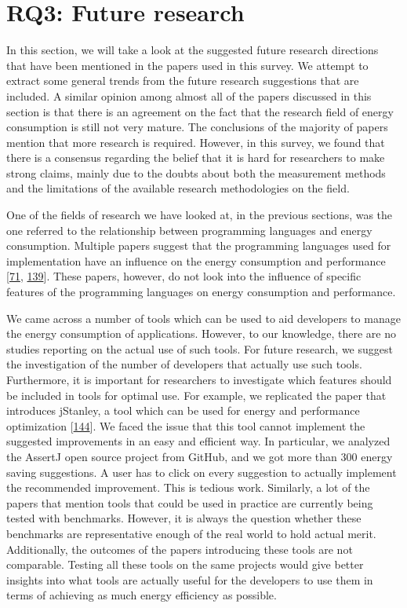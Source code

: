 \documentclass[]{book}
\begin{document}
\section{RQ3: Future research}\label{rq3-future-research-1}

In this section, we will take a look at the suggested future research
directions that have been mentioned in the papers used in this survey.
We attempt to extract some general trends from the future research
suggestions that are included. A similar opinion among almost all of the
papers discussed in this section is that there is an agreement on the
fact that the research field of energy consumption is still not very
mature. The conclusions of the majority of papers mention that more
research is required. However, in this survey, we found that there is a
consensus regarding the belief that it is hard for researchers to make
strong claims, mainly due to the doubts about both the measurement
methods and the limitations of the available research methodologies on
the field.

One of the fields of research we have looked at, in the previous
sections, was the one referred to the relationship between programming
languages and energy consumption. Multiple papers suggest that the
programming languages used for implementation have an influence on the
energy consumption and performance
{[}\protect\hyperlink{ref-GKLS2018}{71},
\protect\hyperlink{ref-OOC2017}{139}{]}. These papers, however, do not
look into the influence of specific features of the programming
languages on energy consumption and performance.

We came across a number of tools which can be used to aid developers to
manage the energy consumption of applications. However, to our
knowledge, there are no studies reporting on the actual use of such
tools. For future research, we suggest the investigation of the number
of developers that actually use such tools. Furthermore, it is important
for researchers to investigate which features should be included in
tools for optimal use. For example, we replicated the paper that
introduces jStanley, a tool which can be used for energy and performance
optimization {[}\protect\hyperlink{ref-PSCS2018}{144}{]}. We faced the
issue that this tool cannot implement the suggested improvements in an
easy and efficient way. In particular, we analyzed the AssertJ open
source project from GitHub, and we got more than 300 energy saving
suggestions. A user has to click on every suggestion to actually
implement the recommended improvement. This is tedious work. Similarly,
a lot of the papers that mention tools that could be used in practice
are currently being tested with benchmarks. However, it is always the
question whether these benchmarks are representative enough of the real
world to hold actual merit. Additionally, the outcomes of the papers
introducing these tools are not comparable. Testing all these tools on
the same projects would give better insights into what tools are
actually useful for the developers to use them in terms of achieving as
much energy efficiency as possible.
\end{document}
